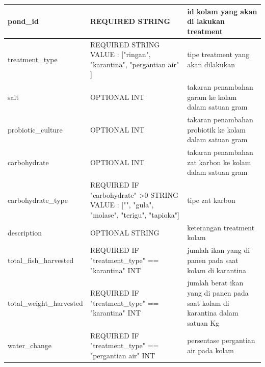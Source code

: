 \begin{enumerate}[1.]
\begin{longtable}{| l | p{5cm} | p{5cm} |}
pond\_id                 & REQUIRED STRING                                                                                          & id kolam yang akan di lakukan treatment                                      \\ \hline
treatment\_type          & REQUIRED STRING VALUE : {[}"ringan", "karantina", "pergantian air" {]}                                   & tipe treatment yang akan dilakukan                                           \\ \hline
salt                     & OPTIONAL INT                                                                                             & takaran penambahan garam ke kolam dalam satuan gram                          \\ \hline
probiotic\_culture       & OPTIONAL INT                                                                                             & takaran penambahan probiotik ke kolam dalam satuan gram                      \\ \hline
carbohydrate             & OPTIONAL INT                                                                                             & takaran penambahan zat karbon ke kolam dalam satuan gram                     \\ \hline
carbohydrate\_type       & REQUIRED IF "carbohydrate" \textgreater 0 STRING VALUE : {[}"", "gula", "molase", "terigu", "tapioka"{]} & tipe zat karbon                                                              \\ \hline
description              & OPTIONAL STRING                                                                                          & keterangan treatment kolam                                                   \\ \hline
total\_fish\_harvested   & REQUIRED IF "treatment\_type" == "karantina" INT                                                         & jumlah ikan yang di panen pada saat kolam di karantina                       \\ \hline
total\_weight\_harvested & REQUIRED IF "treatment\_type" == "karantina" INT                                                         & jumlah berat ikan yang di panen pada saat kolam di karantina dalam satuan Kg \\ \hline
water\_change            & REQUIRED IF "treatment\_type" == "pergantian air" INT                                                    & persentase pergantian air pada kolam                                         \\ \hline
\end{longtable}




\end{enumerate}
